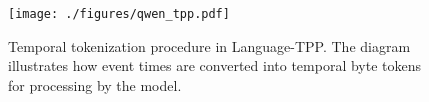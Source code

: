 \begin{figure}[!tbp]
    \centering
    \texttt{[image: ./figures/qwen\_tpp.pdf]}
    \caption{Temporal tokenization procedure in Language-TPP. The diagram illustrates how event times are converted into temporal byte tokens for processing by the model.}
    \label{fig:temporal_tokenization}
    \vspace{-0.4cm}
\end{figure}